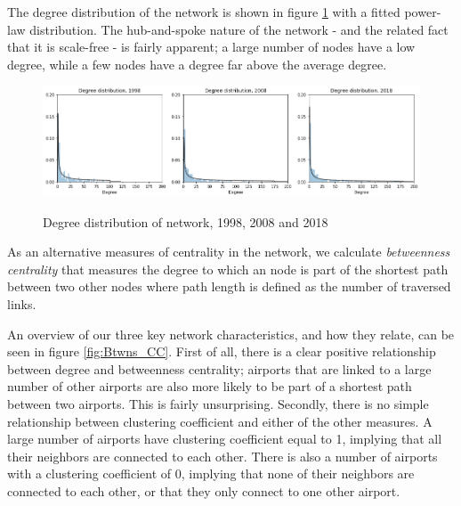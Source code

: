 \noindent
The degree distribution of the network is shown in figure \ref{fig:degree_distribution} with a fitted power-law distribution. The hub-and-spoke nature of the network - and the related fact that it is scale-free - is fairly apparent; a large number of nodes have a low degree, while a few nodes have a degree far above the average degree. 
\begin{figure}[H]
  \centering
  \caption{Degree distribution of network, 1998, 2008 and 2018}
    \includegraphics[width=1 \textwidth]{Exam/Figures/degree_distributionv2.png}
  \label{fig:degree_distribution}
\end{figure}
\noindent
As an alternative measures of centrality in the network, we calculate \textit{betweenness centrality} that measures the degree to which an node is part of the shortest path between two other nodes where path length is defined as the number of traversed links.
\par
An overview of our three key network characteristics, and how they relate, can be seen in figure \ref{fig:Btwns_CC}. First of all, there is a clear positive relationship between degree and betweenness centrality; airports that are linked to a large number of other airports are also more likely to be part of a shortest path between two airports. This is fairly unsurprising. Secondly, there is no simple relationship between clustering coefficient and either of the other measures. A large number of airports have clustering coefficient equal to 1, implying that all their neighbors are connected to each other. There is also a number of airports with a clustering coefficient of 0, implying that none of their neighbors are connected to each other, or that they only connect to one other airport.
